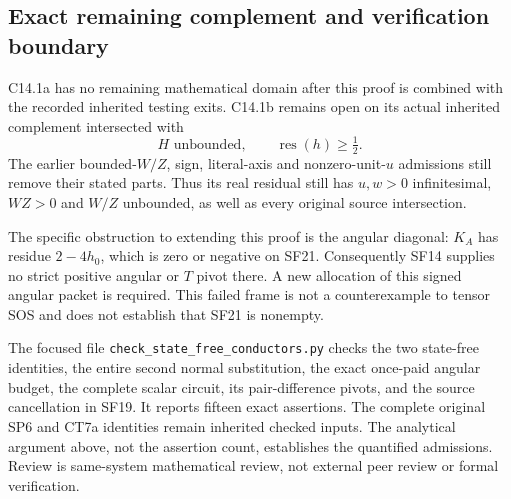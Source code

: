 \subsection{Exact remaining complement and verification boundary}

C14.1a has no remaining mathematical domain after this proof is
combined with the recorded inherited testing exits. C14.1b remains
open on its actual inherited complement intersected with
\[
 H\text{ unbounded},\qquad \operatorname{res}(h)\ge\tfrac12.
 \tag{SF21}
\]
The earlier bounded-$W/Z$, sign, literal-axis and nonzero-unit-$u$
admissions still remove their stated parts. Thus its real residual
still has $u,w>0$ infinitesimal, $WZ>0$ and $W/Z$ unbounded,
as well as every original source intersection.

The specific obstruction to extending this proof is the angular
diagonal: $K_A$ has residue $2-4h_0$, which is zero or negative on
SF21. Consequently SF14 supplies no strict positive angular or $T$
pivot there. A new allocation of this signed angular packet is
required. This failed frame is not a counterexample to tensor SOS
and does not establish that SF21 is nonempty.

The focused file \texttt{check\_state\_free\_conductors.py} checks the
two state-free identities, the entire second normal substitution,
the exact once-paid angular budget, the complete scalar circuit,
its pair-difference pivots, and the source cancellation in SF19.
It reports fifteen exact assertions. The complete original SP6 and
CT7a identities remain inherited checked inputs. The analytical
argument above, not the assertion count, establishes the quantified
admissions. Review is same-system mathematical review, not external
peer review or formal verification.
